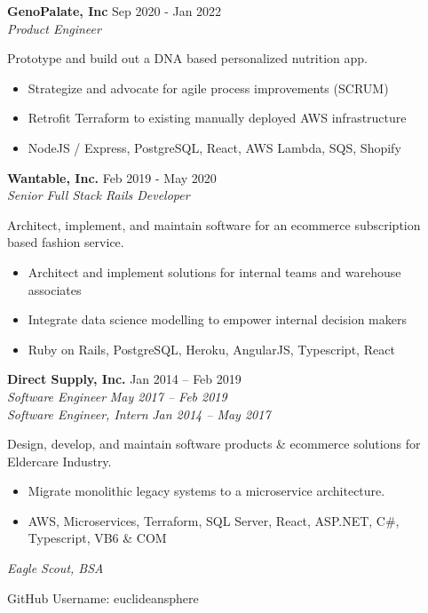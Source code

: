 \documentclass[line,margin]{res}
\begin{document}
\begin{resume}
\textbf{GenoPalate, Inc} \hfill Sep 2020 - Jan 2022 \\
{\sl Product Engineer}

Prototype and build out a DNA based personalized nutrition app.

\begin{itemize}
\item Strategize and advocate for agile process improvements (SCRUM)
\item Retrofit Terraform to existing manually deployed AWS infrastructure
\item NodeJS / Express, PostgreSQL, React, AWS Lambda, SQS, Shopify
\end{itemize}

\textbf{Wantable, Inc.} \hfill Feb 2019 - May 2020 \\
{\sl Senior Full Stack Rails Developer}

Architect, implement, and maintain software for an ecommerce subscription based fashion service.

\begin{itemize}
\item Architect and implement solutions for internal teams and warehouse associates
\item Integrate data science modelling to empower internal decision makers
\item Ruby on Rails, PostgreSQL, Heroku, AngularJS, Typescript, React
\end{itemize}

\textbf{Direct Supply, Inc.} \hfill Jan 2014 -- Feb 2019 \\
{\sl Software Engineer} \hfill {\sl May 2017 -- Feb 2019} \\
{\sl Software Engineer, Intern} \hfill {\sl Jan 2014 -- May 2017}

Design, develop, and maintain software products \& ecommerce solutions for Eldercare Industry.

\begin{itemize}
\item Migrate monolithic legacy systems to a microservice architecture. 
\item AWS, Microservices, Terraform, SQL Server, React, ASP.NET, C\#, Typescript, VB6 \& COM
\end{itemize}




{\sl Eagle Scout, BSA}

GitHub Username: euclideansphere

\end{resume}
\end{document}
